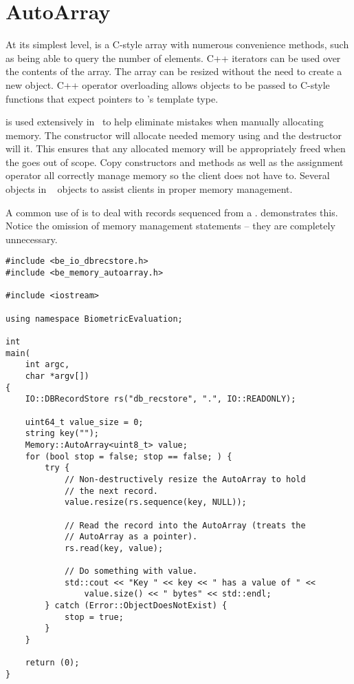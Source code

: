 \section{AutoArray}
\label{sec-autoarray}
At its simplest level,  is a C-style array with numerous convenience 
methods, such as being able to query the number of elements.  C++ iterators
can be used over the contents of the array.  The array can be resized without
the need to create a new object.  C++ operator overloading allows 
objects to be passed to C-style functions that expect pointers to 's
template type.

 is used extensively in \sname\ to help eliminate mistakes when
manually allocating memory.  The  constructor will allocate needed
memory using  and the destructor will  it.  This ensures
that any allocated memory will be appropriately freed when the  goes
out of scope.  Copy constructors and methods as well as the assignment operator
all correctly manage memory so the client does not have to.  Several objects in
\sname\   objects to assist clients in proper memory management.

A common use of  is to deal with records sequenced from a
.  demonstrates this.  Notice the
omission of memory management statements -- they are completely unnecessary.

\begin{lstlisting}[caption={Using \class{AutoArray}s with \class{RecordStore}s}, label=lst:autoarrayrsuse]
#include <be_io_dbrecstore.h>
#include <be_memory_autoarray.h>

#include <iostream>

using namespace BiometricEvaluation;

int
main(
    int argc,
    char *argv[])
{
	IO::DBRecordStore rs("db_recstore", ".", IO::READONLY);

	uint64_t value_size = 0;
	string key("");
	Memory::AutoArray<uint8_t> value;
	for (bool stop = false; stop == false; ) {
		try {
			// Non-destructively resize the AutoArray to hold
			// the next record.
			value.resize(rs.sequence(key, NULL));

			// Read the record into the AutoArray (treats the
			// AutoArray as a pointer).
			rs.read(key, value);

			// Do something with value.
			std::cout << "Key " << key << " has a value of " <<
			    value.size() << " bytes" << std::endl;
		} catch (Error::ObjectDoesNotExist) {
			stop = true;
		}
	}

	return (0);
}
\end{lstlisting}


